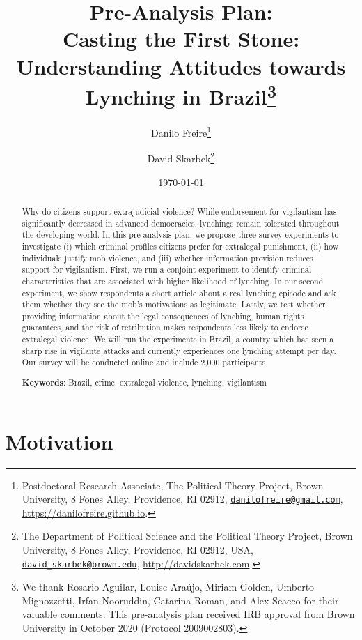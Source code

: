 \documentclass[12pt,a4paper,]{article}
\title{Pre-Analysis Plan:\\
Casting the First Stone: Understanding Attitudes towards Lynching in
Brazil\footnote{We thank Rosario Aguilar, Louise Araújo, Miriam Golden,
  Umberto Mignozzetti, Irfan Nooruddin, Catarina Roman, and Alex Scacco
  for their valuable comments. This pre-analysis plan received IRB
  approval from Brown University in October 2020 (Protocol 2009002803).}}
\author{Danilo Freire\footnote{Postdoctoral Research Associate, The Political
  Theory Project, Brown University, 8 Fones Alley, Providence, RI 02912,
  \href{mailto:danilofreire@gmail.com}{\texttt{danilofreire@gmail.com}},
  \url{https://danilofreire.github.io}.} \and David Skarbek\footnote{The Department of Political Science and the
  Political Theory Project, Brown University, 8 Fones Alley, Providence,
  RI 02912, USA,
  \href{mailto:david_skarbek@brown.edu}{\texttt{david\_skarbek@brown.edu}},
  \url{http://davidskarbek.com}.}}
\date{\today}
\begin{document}
\maketitle

\begin{abstract}
\doublespacing \noindent Why do citizens support extrajudicial violence? While endorsement for
vigilantism has significantly decreased in advanced democracies,
lynchings remain tolerated throughout the developing world. In this
pre-analysis plan, we propose three survey experiments to investigate
(i) which criminal profiles citizens prefer for extralegal punishment,
(ii) how individuals justify mob violence, and (iii) whether information
provision reduces support for vigilantism. First, we run a conjoint
experiment to identify criminal characteristics that are associated with
higher likelihood of lynching. In our second experiment, we show
respondents a short article about a real lynching episode and ask them
whether they see the mob's motivations as legitimate. Lastly, we test
whether providing information about the legal consequences of lynching,
human rights guarantees, and the risk of retribution makes respondents
less likely to endorse extralegal violence. We will run the experiments
in Brazil, a country which has seen a sharp rise in vigilante attacks
and currently experiences one lynching attempt per day. Our survey will
be conducted online and include 2,000 participants.
\vspace{.25cm}

\noindent \textbf{Keywords}: Brazil, crime, extralegal violence, lynching, vigilantism
\vspace{.25cm}

\end{abstract}


\newpage

\hypertarget{motivation}{%
\section{Motivation}\label{motivation}}

\label{sec:motivation}

\doublespacing
\end{document}
